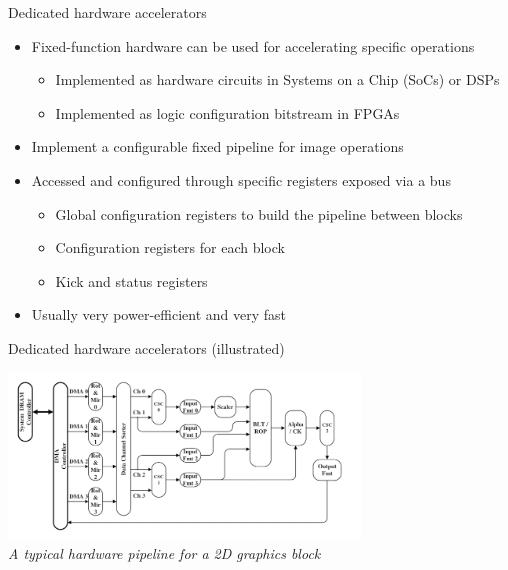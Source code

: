 \begin{frame}{Dedicated hardware accelerators}
  \begin{itemize}
  \item Fixed-function hardware can be used for accelerating specific operations
  \begin{itemize}
    \item Implemented as hardware circuits in Systems on a Chip (SoCs) or DSPs
    \item Implemented as logic configuration bitstream in FPGAs
  \end{itemize}
  \item Implement a configurable fixed pipeline for image operations
  \item Accessed and configured through specific registers exposed via a bus
    \begin{itemize}
    \item Global configuration registers to build the pipeline between blocks
    \item Configuration registers for each block
    \item Kick and status registers
    \end{itemize}
  \item Usually very power-efficient and very fast
  \end{itemize}
\end{frame}

\begin{frame}{Dedicated hardware accelerators (illustrated)}
  \begin{center}
    \includegraphics[width=0.7\textwidth]{slides/graphics-introduction/g2d-block.png}\\
    \textit{A typical hardware pipeline for a 2D graphics block}\\
  \end{center}
\end{frame}

